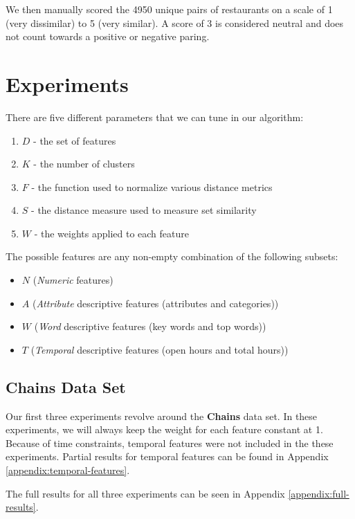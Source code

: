 \documentclass{article}
\begin{document}
      We then manually scored the 4950 unique pairs of restaurants on a scale of 1 (very dissimilar) to 5 (very similar).
      A score of 3 is considered neutral and does not count towards a positive or negative paring.

\section{Experiments}

   There are five different parameters that we can tune in our algorithm:
   \begin{enumerate}
      \item $D$ - the set of features
      \item $K$ - the number of clusters
      \item $F$ - the function used to normalize various distance metrics
      \item $S$ - the distance measure used to measure set similarity
      \item $W$ - the weights applied to each feature
   \end{enumerate}

   The possible features are any non-empty combination of the following subsets:
   \begin{itemize}
      \item $N$ (\textit{Numeric} features)
      \item $A$ (\textit{Attribute} descriptive features (attributes and categories))
      \item $W$ (\textit{Word} descriptive features (key words and top words))
      \item $T$ (\textit{Temporal} descriptive features (open hours and total hours))
   \end{itemize}

   \subsection{Chains Data Set}
      Our first three experiments revolve around the \textbf{Chains} data set.
      In these experiments, we will always keep the weight for each feature constant at 1.
      Because of time constraints, temporal features were not included in the these experiments.
      Partial results for temporal features can be found in Appendix \ref{appendix:temporal-features}.

      The full results for all three experiments can be seen in Appendix \ref{appendix:full-results}.
\end{document}
